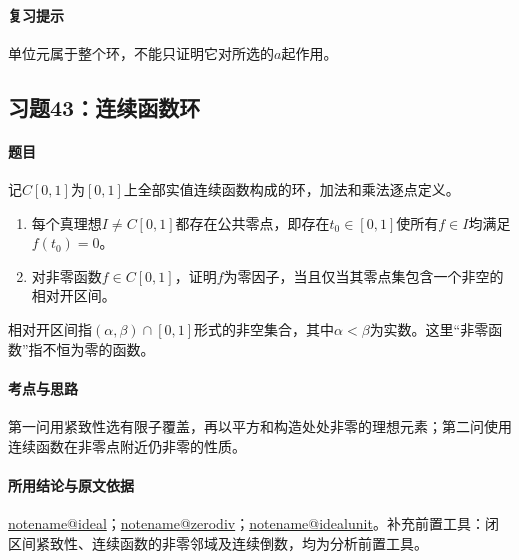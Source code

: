 \documentclass[UTF8,a4paper,11pt,fontset=windows]{ctexart}
\makeatletter
\newcommand{\noteref}[1]{\hyperref[note:#1]{\csname notename@#1\endcsname}}
\newcommand{\exref}[2]{\hyperref[ex:#1:#2]{第#1章习题#2}}
\makeatother
\begin{document}
\paragraph{复习提示}
单位元属于整个环，不能只证明它对所选的$a$起作用。


\subsection{习题43：\texorpdfstring{连续函数环}{连续函数环}}
\label{ex:1:43}

\paragraph{题目}
记$C[0,1]$为$[0,1]$上全部实值连续函数构成的环，加法和乘法逐点定义。
\begin{enumerate}
\item 每个真理想$I\ne C[0,1]$都存在公共零点，即存在$t_0\in[0,1]$使所有$f\in I$均满足$f(t_0)=0$。
\item 对非零函数$f\in C[0,1]$，证明$f$为零因子，当且仅当其零点集包含一个非空的相对开区间。
\end{enumerate}
相对开区间指$(\alpha,\beta)\cap[0,1]$形式的非空集合，其中$\alpha<\beta$为实数。这里“非零函数”指不恒为零的函数。

\paragraph{考点与思路}
第一问用紧致性选有限子覆盖，再以平方和构造处处非零的理想元素；第二问使用连续函数在非零点附近仍非零的性质。

\paragraph{所用结论与原文依据}
\noteref{ideal}；\noteref{zerodiv}；\noteref{idealunit}。补充前置工具：闭区间紧致性、连续函数的非零邻域及连续倒数，均为分析前置工具。

\end{document}
